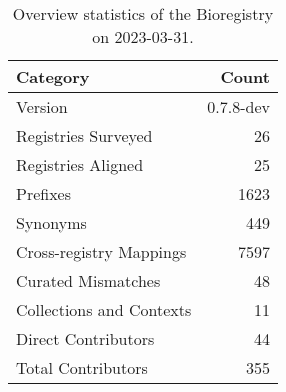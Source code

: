 \begin{table}
\centering
\caption{Overview statistics of the Bioregistry on 2023-03-31.}
\label{tab:bioregistry-summary}
\begin{tabular}{lr}
\toprule
                Category &     Count \\
\midrule
                 Version & 0.7.8-dev \\
     Registries Surveyed &        26 \\
      Registries Aligned &        25 \\
                Prefixes &      1623 \\
                Synonyms &       449 \\
 Cross-registry Mappings &      7597 \\
      Curated Mismatches &        48 \\
Collections and Contexts &        11 \\
     Direct Contributors &        44 \\
      Total Contributors &       355 \\
\bottomrule
\end{tabular}
\end{table}
